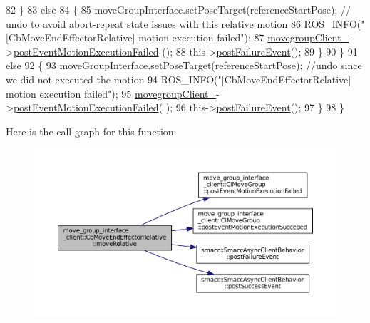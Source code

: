 \begin{DoxyCode}
82             \}
83             \textcolor{keywordflow}{else}
84             \{
85                 moveGroupInterface.setPoseTarget(referenceStartPose); \textcolor{comment}{// undo to avoid abort-repeat state
       issues with this relative motion}
86                 ROS\_INFO(\textcolor{stringliteral}{"[CbMoveEndEffectorRelative] motion execution failed"});
87                 \hyperlink{classmove__group__interface__client_1_1CbMoveEndEffectorRelative_a979ec9c309b1b52a0d0e254b49865fdc}{movegroupClient\_}->\hyperlink{classmove__group__interface__client_1_1ClMoveGroup_a41c0eebdb446e6fbdd17113524c34869}{postEventMotionExecutionFailed}
      ();
88                 this->\hyperlink{classsmacc_1_1SmaccAsyncClientBehavior_af6fa358cb1ab5ed16791a201f59260e0}{postFailureEvent}();
89             \}
90         \}
91         \textcolor{keywordflow}{else}
92         \{
93             moveGroupInterface.setPoseTarget(referenceStartPose); \textcolor{comment}{//undo since we did not executed the
       motion}
94             ROS\_INFO(\textcolor{stringliteral}{"[CbMoveEndEffectorRelative] motion execution failed"});
95             \hyperlink{classmove__group__interface__client_1_1CbMoveEndEffectorRelative_a979ec9c309b1b52a0d0e254b49865fdc}{movegroupClient\_}->\hyperlink{classmove__group__interface__client_1_1ClMoveGroup_a41c0eebdb446e6fbdd17113524c34869}{postEventMotionExecutionFailed}(
      );
96             this->\hyperlink{classsmacc_1_1SmaccAsyncClientBehavior_af6fa358cb1ab5ed16791a201f59260e0}{postFailureEvent}();
97         \}
98     \}
\end{DoxyCode}
Here is the call graph for this function\+:
\nopagebreak
\begin{figure}[H]
\begin{center}
\leavevmode
\includegraphics[width=350pt]{classmove__group__interface__client_1_1CbMoveEndEffectorRelative_a8f64d14c4a398b455b1953ae61cc58bc_cgraph}
\end{center}
\end{figure}
